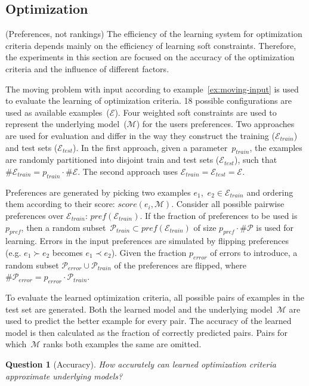\documentclass[letterpaper]{article}
\newcommand{\sym}[1]{\ensuremath{\mathcal{#1}}}
\newtheorem{question}{Question}
\theoremstyle{definition}
\newcommand{\sam}[1]{{\color{red}(#1)}}
\begin{document}
\subsection{Optimization} \sam{Preferences, not rankings}
The efficiency of the learning system for optimization criteria depends mainly on the efficiency of learning soft constraints.
Therefore, the experiments in this section are focused on the accuracy of the optimization criteria and the influence of different factors.

The moving problem with input according to example~\ref{ex:moving-input} is used to evaluate the learning of optimization criteria.
18 possible configurations are used as available examples~(\sym{E}).
Four weighted soft constraints are used to represent the underlying model~(\sym{M}) for the users preferences.
Two approaches are used for evaluation and differ in the way they construct the training ($\sym{E}_{train}$) and test sets ($\sym{E}_{test}$).
In the first approach, given a parameter~$p_{train}$, the examples are randomly partitioned into disjoint train and test sets ($\sym{E}_{test}$), such that $\#\sym{E}_{train} = p_{train} \cdot \#\sym{E}$.
The second approach uses $\sym{E}_{train} = \sym{E}_{test} = \sym{E}$.

Preferences are generated by picking two examples $e_1$,~$e_2 \in \sym{E}_{train}$ and ordering them according to their score: $score(e_i, \sym{M})$.
Consider all possible pairwise preferences over $\sym{E}_{train}$: $\mathit{pref}(\sym{E}_{train})$.
If the fraction of preferences to be used is~$p_{pref}$, then a random subset~$\sym{P}_{train} \subset \mathit{pref}(\sym{E}_{train})$ of size $p_{pref} \cdot \# \sym{P}$ is used for learning.
Errors in the input preferences are simulated by flipping preferences (e.g. $e_1 \succ e_2$ becomes $e_1 \prec e_2$).
Given the fraction $p_{error}$ of errors to introduce, a random subset $\sym{P}_{error} \cup \sym{P}_{train}$ of the preferences are flipped, where $\#\sym{P}_{error} = p_{error} \cdot \sym{P}_{train}$.

To evaluate the learned optimization criteria, all possible pairs of examples in the test set are generated.
Both the learned model and the underlying model~$\sym{M}$ are used to predict the better example for every pair.
The accuracy of the learned model is then calculated as the fraction of correctly predicted pairs. 
Pairs for which~\sym{M} ranks both examples the same are omitted.

\begin{question}[Accuracy]
  How accurately can learned optimization criteria approximate underlying models?
\end{question}
\end{document}
